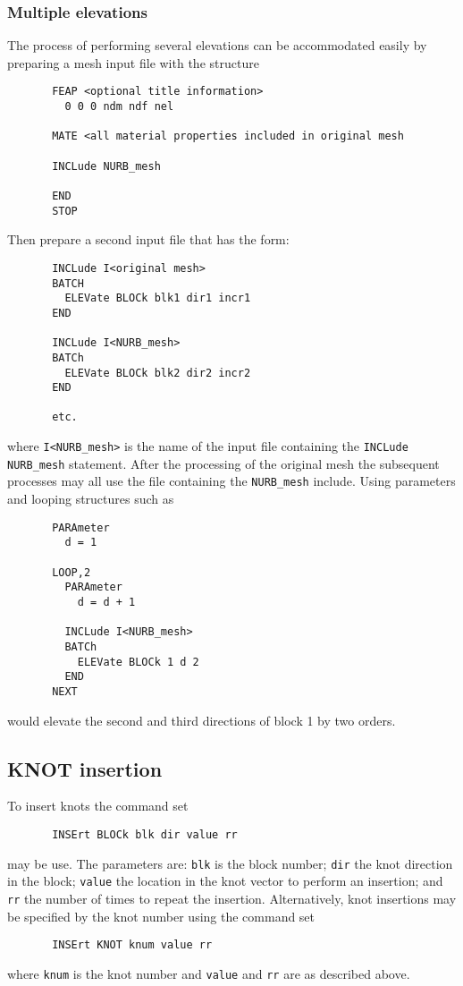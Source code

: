 \subsubsection{Multiple elevations}

The process of performing several elevations can be accommodated easily by
preparing a mesh input file with the structure
\begin{verbatim}
       FEAP <optional title information>
         0 0 0 ndm ndf nel

       MATE <all material properties included in original mesh

       INCLude NURB_mesh

       END
       STOP
\end{verbatim}
Then prepare a second input file that has the form:
\begin{verbatim}
       INCLude I<original mesh>
       BATCH
         ELEVate BLOCk blk1 dir1 incr1
       END

       INCLude I<NURB_mesh>
       BATCh
         ELEVate BLOCk blk2 dir2 incr2
       END

       etc.
\end{verbatim}
where \texttt{I<NURB\_mesh>} is the name of the input file containing the
\texttt{INCLude NURB\_mesh} statement.
After the processing of the original mesh the subsequent processes may all
use the file containing the \texttt{NURB\_mesh} include.  Using parameters
and looping structures such as
\begin{verbatim}
       PARAmeter
         d = 1

       LOOP,2
         PARAmeter
           d = d + 1

         INCLude I<NURB_mesh>
         BATCh
           ELEVate BLOCk 1 d 2
         END
       NEXT
\end{verbatim}
would elevate the second and third directions of block 1 by two orders.

\subsection{KNOT insertion}

To insert knots the command set
\begin{verbatim}
       INSErt BLOCk blk dir value rr
\end{verbatim}
may be use.  The parameters are: \texttt{blk} is the block number;
\texttt{dir} the knot direction in the block; \texttt{value} the location
in the knot vector to perform an insertion; and \texttt{rr} the number of
times to repeat the insertion.
Alternatively, knot insertions may be specified by the knot number using the
command set
\begin{verbatim}
       INSErt KNOT knum value rr
\end{verbatim}
where \texttt{knum} is the knot number and \texttt{value} and \texttt{rr} are
as described above.

